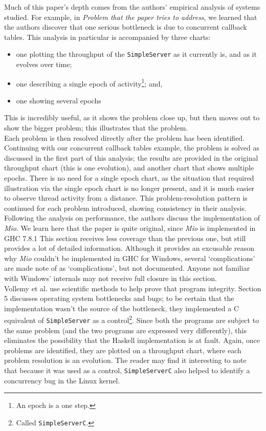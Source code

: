 \documentclass[9pt]{report}
\begin{document}
\noindent
Much of this paper's depth comes from the authors' empirical analysis of systems studied.
For example, in {\it Problem that the paper tries to address}, we learned that the authors discover that one serious bottleneck is due to concurrent callback tables.
This analysis in particular is accompanied by three charts:
\begin{itemize}
\item one plotting the throughput of the \verb/SimpleServer/ as it currently is, and as it evolves over time;
\item one describing a single epoch of activity\footnote{An epoch is a one step.}; and,
\item one showing several epochs
\end{itemize}

This is incredibly useful, as it shows the problem close up, but then moves out to show the bigger problem; this illustrates that the problem.\\

Each problem is then resolved directly after the problem has been identified.
Continuing with our concurrent callback tables example, the problem is solved as discussed in the first part of this analysis; the results are provided in the original throughput chart (this is one evolution), and another chart that shows multiple epochs.
There is no need for a single epoch chart, as the situation that required illustration via the single epoch chart is no longer present, and it is much easier to observe thread activity from a distance.
This problem-resolution pattern is continued for each problem introduced, showing consistency in their analysis.\\

\noindent
Following the analysis on performance, the authors discuss the implementation of {\it Mio}.
We learn here that the paper is quite original, since {\it Mio} is implemented in GHC 7.8.1
This section receives less coverage than the previous one, but still provides a lot of detailed information.
Although it provides an excusable reason why {\it Mio} couldn't be implemented in GHC for Windows, several `complications' are made note of as `complications', but not documented.
Anyone not familiar with Windows' internals may not receive full closure in this section.\\

\noindent
Vollemy et al. use scientific methods to help prove that program integrity.
Section 5 discusses operating system bottlenecks and bugs; to be certain that the implementation wasn't the source of the bottleneck, they implemented a C equivalent of \verb/SimpleServer/ as a control\footnote{Called \texttt{SimpleServerC}.}.
Since both the programs are subject to the same problem (and the two programs are expressed very differently), this eliminates the possibility that the Haskell implementation is at fault.
Again, once problems are identified, they are plotted on a throughput chart, where each problem resolution is an evolution.
The reader may find it interesting to note that because it was used as a control, \verb/SimpleServerC/ also helped to identify a concurrency bug in the Linux kernel.\\
\end{document}
